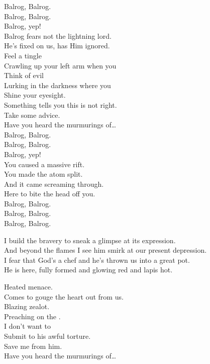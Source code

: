 Balrog, Balrog. \\
Balrog, Balrog. \\
Balrog, yep! \\

Balrog fears not the lightning lord. \\
He's fixed on us, has Him ignored. \\

Feel a tingle \\
Crawling up your left arm when you \\
Think of evil \\
Lurking in the darkness where you \\
Shine your eyesight. \\
Something tells you this is not right. \\
Take some advice. \\
Have you heard the murmurings of… \\

Balrog, Balrog. \\
Balrog, Balrog. \\
Balrog, yep! \\

You caused a massive rift. \\
You made the atom split. \\
And it came screaming through. \\
Here to bite the head off you. \\

Balrog, Balrog. \\
Balrog, Balrog. \\
Balrog, Balrog. \\


I build the bravery to sneak a glimpse at its expression. \\
And beyond the flames I see him smirk at our present depression. \\

I fear that God's a chef and he's thrown us into a great pot. \\
He is here, fully formed and glowing red and lapis hot. \\


Heated menace. \\
Comes to gouge the heart out from us. \\
Blazing zealot. \\
Preaching on the . \\
I don't want to \\
Submit to his awful torture. \\
Save me from him. \\
Have you heard the murmurings of… \\

